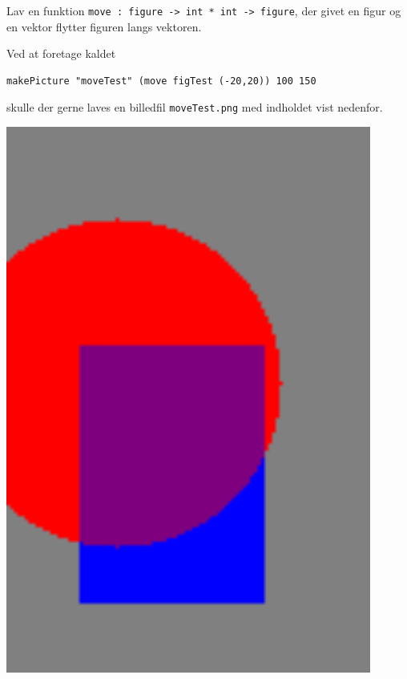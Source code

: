 Lav en funktion \texttt{move : figure -> int * int ->
    figure}, der givet en figur og en vektor flytter figuren langs
  vektoren.

  Ved at foretage kaldet
\begin{verbatim}
makePicture "moveTest" (move figTest (-20,20)) 100 150
\end{verbatim}
  skulle der gerne laves en billedfil \texttt{moveTest.png}
  med indholdet vist nedenfor.
  \begin{center}
    \begin{minipage}{.2\textwidth}
      \includegraphics[width=0.9\textwidth]{moveTest.png}
    \end{minipage}
  \end{center}
